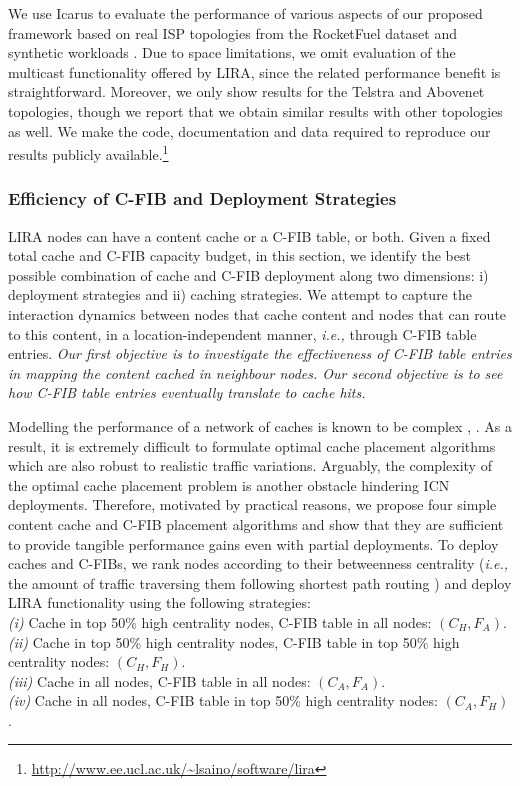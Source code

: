 \documentclass{sig-alternate}
\newcommand{\ie}{{\em i.e.,\/ }}
\begin{document}
We use Icarus \cite{icarus} to evaluate the performance of various aspects of our proposed framework based on real ISP topologies from the RocketFuel dataset \cite{rocketfuel-sigcomm02} and synthetic workloads \cite{globetraff}. Due to space limitations, we omit evaluation of the multicast functionality offered by LIRA, since the related performance benefit is straightforward. Moreover, we only show results for the Telstra and Abovenet topologies, though we report that we obtain similar results with other topologies as well. We make the code, documentation and data required to reproduce our results publicly available.\footnote{\url{http://www.ee.ucl.ac.uk/~lsaino/software/lira}}





\subsubsection{Efficiency of C-FIB and Deployment Strategies}

LIRA nodes can have a content cache or a C-FIB table, or both.
Given a fixed total cache and C-FIB capacity budget, in this section, we identify the best possible combination of cache and C-FIB deployment along two dimensions: i) deployment strategies and ii) caching strategies.
We attempt to capture the interaction dynamics between nodes that cache content and nodes that can route to this content, in a location-independent manner, \ie through C-FIB table entries.
\textit{Our first objective is to investigate the effectiveness of C-FIB table entries in mapping the content cached in neighbour nodes. Our second objective is to see how C-FIB table entries eventually translate to cache hits.}



Modelling the performance of a network of caches is known to be complex \cite{anet-infocom13}, \cite{complexity-infocom15}. As a result, it is extremely difficult to formulate optimal cache placement algorithms which are also robust to realistic traffic variations.
Arguably, the complexity of the optimal cache placement problem is another obstacle hindering ICN deployments.
Therefore, motivated by practical reasons, we propose four simple content cache and C-FIB placement algorithms and show that they are sufficient to provide tangible performance gains even with partial deployments.
To deploy caches and C-FIBs, we rank nodes according to their betweenness centrality (\ie the amount of traffic traversing them following shortest path routing \cite{clam-comcom}) and deploy LIRA functionality using the following strategies:
\\
\textit{(i)} Cache in top 50\% high centrality nodes, C-FIB table in all nodes: $\left(C_{H}, F_{A} \right)$.\\ 
\textit{(ii)} Cache in top 50\% high centrality nodes, C-FIB table in top 50\% high centrality nodes: $\left(C_{H}, F_{H} \right)$.\\
\textit{(iii)} Cache in all nodes, C-FIB table in all nodes: $\left(C_{A}, F_{A} \right)$.\\
\textit{(iv)} Cache in all nodes, C-FIB table in top 50\% high centrality nodes: $\left(C_{A}, F_{H} \right)$.
\end{document}
